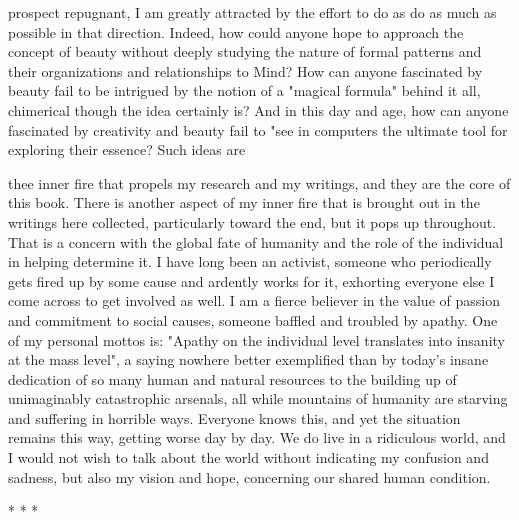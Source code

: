 prospect repugnant, I am greatly attracted by the effort to do as do as much as
possible in that direction. Indeed, how could anyone hope to approach the concept of
beauty without deeply studying the nature of formal patterns and their organizations
and relationships to Mind? How can anyone fascinated by beauty fail to be intrigued
by the notion of a "magical formula" behind it all, chimerical though the idea
certainly is? And in this day and age, how can anyone fascinated by creativity and
beauty fail to "see in computers the ultimate tool for exploring their essence? Such
ideas are





thee inner fire that propels my research and my writings, and they are the core of this
book.
        There is another aspect of my inner fire that is brought out in the writings here
collected, particularly toward the end, but it pops up throughout. That is a concern
with the global fate of humanity and the role of the individual in helping determine it.
I have long been an activist, someone who periodically gets fired up by some cause
and ardently works for it, exhorting everyone else I come across to get involved as
well. I am a fierce believer in the value of passion and commitment to social causes,
someone baffled and troubled by apathy. One of my personal mottos is: "Apathy on
the individual level translates into insanity at the mass level", a saying nowhere better
exemplified than by today's insane dedication of so many human and natural
resources to the building up of unimaginably catastrophic arsenals, all while
mountains of humanity are starving and suffering in horrible ways. Everyone knows
this, and yet the situation remains this way, getting worse day by day. We do live in a
ridiculous world, and I would not wish to talk about the world without indicating my
confusion and sadness, but also my vision and hope, concerning our shared human
condition.

                                       *   *   *

